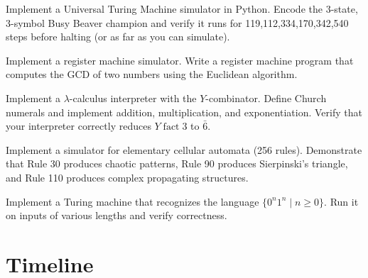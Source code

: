 \begin{exercise}[Computational]
Implement a Universal Turing Machine simulator in Python. Encode the 3-state, 3-symbol Busy Beaver champion and verify it runs for 119,112,334,170,342,540 steps before halting (or as far as you can simulate).
\end{exercise}

\begin{exercise}[Computational]
Implement a register machine simulator. Write a register machine program that computes the GCD of two numbers using the Euclidean algorithm.
\end{exercise}

\begin{exercise}[Computational]
Implement a $\lambda$-calculus interpreter with the $Y$-combinator. Define Church numerals and implement addition, multiplication, and exponentiation. Verify that your interpreter correctly reduces $Y\;\text{fact}\;3$ to $\bar{6}$.
\end{exercise}

\begin{exercise}[Computational]
Implement a simulator for elementary cellular automata (256 rules). Demonstrate that Rule 30 produces chaotic patterns, Rule 90 produces Sierpinski's triangle, and Rule 110 produces complex propagating structures.
\end{exercise}

\begin{exercise}[Computational]
Implement a Turing machine that recognizes the language $\{0^n 1^n \mid n \geq 0\}$. Run it on inputs of various lengths and verify correctness.
\end{exercise}

\section{Timeline}
\label{sec:computation:timeline}

